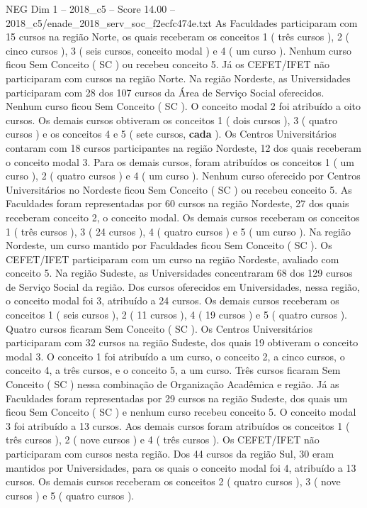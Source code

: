 \begin{textsample}{NEG Dim 1 – 2018\_c5 – Score 14.00 – 2018\_c5/enade\_2018\_serv\_soc\_f2ecfc474e.txt}
As Faculdades participaram com 15 cursos na região Norte, os quais receberam os conceitos 1 ( três cursos ), 2 ( cinco cursos ), 3 ( seis cursos, conceito modal ) e 4 ( um curso ).
Nenhum curso ficou Sem Conceito ( SC ) ou recebeu conceito 5.
Já os CEFET/IFET não participaram com cursos na região Norte.
Na região Nordeste, as Universidades participaram com 28 dos 107 cursos da Área de Serviço Social oferecidos.
Nenhum curso ficou Sem Conceito ( SC ).
O conceito modal 2 foi atribuído a oito cursos.
Os demais cursos obtiveram os conceitos 1 ( dois cursos ), 3 ( quatro cursos ) e os conceitos 4 e 5 ( sete cursos, \textbf{cada} ).
Os Centros Universitários contaram com 18 cursos participantes na região Nordeste, 12 dos quais receberam o conceito modal 3.
Para os demais cursos, foram atribuídos os conceitos 1 ( um curso ), 2 ( quatro cursos ) e 4 ( um curso ).
Nenhum curso oferecido por Centros Universitários no Nordeste ficou Sem Conceito ( SC ) ou recebeu conceito 5.
As Faculdades foram representadas por 60 cursos na região Nordeste, 27 dos quais receberam conceito 2, o conceito modal.
Os demais cursos receberam os conceitos 1 ( três cursos ), 3 ( 24 cursos ), 4 ( quatro cursos ) e 5 ( um curso ).
Na região Nordeste, um curso mantido por Faculdades ficou Sem Conceito ( SC ).
Os CEFET/IFET participaram com um curso na região Nordeste, avaliado com conceito 5.
Na região Sudeste, as Universidades concentraram 68 dos 129 cursos de Serviço Social da região.
Dos cursos oferecidos em Universidades, nessa região, o conceito modal foi 3, atribuído a 24 cursos.
Os demais cursos receberam os conceitos 1 ( seis cursos ), 2 ( 11 cursos ), 4 ( 19 cursos ) e 5 ( quatro cursos ).
Quatro cursos ficaram Sem Conceito ( SC ).
Os Centros Universitários participaram com 32 cursos na região Sudeste, dos quais 19 obtiveram o conceito modal 3.
O conceito 1 foi atribuído a um curso, o conceito 2, a cinco cursos, o conceito 4, a três cursos, e o conceito 5, a um curso.
Três cursos ficaram Sem Conceito ( SC ) nessa combinação de Organização Acadêmica e região.
Já as Faculdades foram representadas por 29 cursos na região Sudeste, dos quais um ficou Sem Conceito ( SC ) e nenhum curso recebeu conceito 5.
O conceito modal 3 foi atribuído a 13 cursos.
Aos demais cursos foram atribuídos os conceitos 1 ( três cursos ), 2 ( nove cursos ) e 4 ( três cursos ).
Os CEFET/IFET não participaram com cursos nesta região.
Dos 44 cursos da região Sul, 30 eram mantidos por Universidades, para os quais o conceito modal foi 4, atribuído a 13 cursos.
Os demais cursos receberam os conceitos 2 ( quatro cursos ), 3 ( nove cursos ) e 5 ( quatro cursos ).

\end{textsample}

